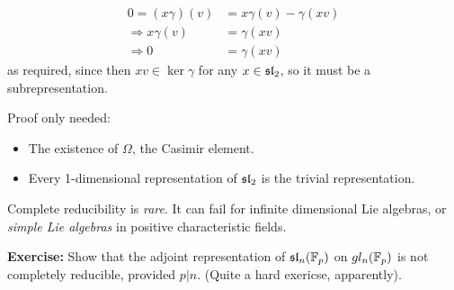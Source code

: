 \documentclass{article}
\begin{document}
\begin{align*}
    0 = (x \gamma)(v)&=x \gamma(v)-\gamma(xv)\\
    \Rightarrow x \gamma(v)&=\gamma(xv)\\
    \Rightarrow 0 &= \gamma(xv) \tag{$v \in \ker \gamma$}
\end{align*}
as required, since then $xv \in \ker \gamma$ for any $x \in \mathfrak{sl}_{2}$, so it must be a subrepresentation. \endproof
\begin{remark}
    Proof only needed:
    \begin{itemize}
        \item The existence of $\Omega$, the Casimir element.
        \item Every 1-dimensional representation of $\mathfrak{sl}_{2}$ is the trivial representation.
    \end{itemize}
\end{remark}
\begin{remark}
    Complete reducibility is \textit{rare}. It can fail for infinite dimensional Lie algebras, or \textit{simple Lie algebras} in positive characteristic fields.
\end{remark}
\textbf{Exercise: } Show that the adjoint representation of $\mathfrak{sl}_{n}(\mathbb{F}_{p})$ on $gl_{n}(\mathbb{F}_{p})$ is not completely reducible, provided $p | n$. (Quite a hard exericse, apparently).
\end{document}
